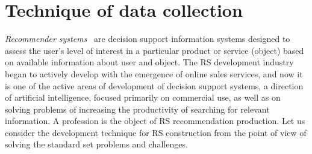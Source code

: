\documentclass[conference,a4]{IEEEtran}
\begin{document}
\section{Technique of data collection}
\label{sec:base}

\emph{Recommender systems}~\cite{rs_basics} are decision support information systems designed to assess the user's level of interest in a particular product or service (object) based on available information about user and object.  The RS development industry began to actively develop with the emergence of online sales services, and now it is one of the active areas of development of decision support systems, a direction of artificial intelligence, focused primarily on commercial use, as well as on solving problems of increasing the productivity of searching for relevant information.  A profession is the object of RS recommendation production.  Let us consider the development technique for RS construction from the point of view of solving the standard set problems and challenges.
\end{document}

